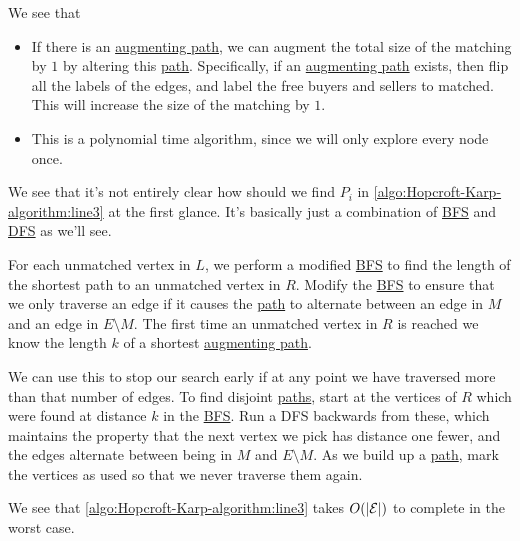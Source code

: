 \begin{intuition}
	We see that
	\begin{itemize}
		\item If there is an \hyperref[def:augmenting-path]{augmenting path}, we can augment the total size of the matching by \(1\) by altering this \hyperref[def:path]{path}. Specifically, if an \hyperref[def:augmenting-path]{augmenting path} exists, then flip all the labels of the edges, and label the free buyers and sellers to matched. This will increase the size of the matching by \(1\).
		\item This is a polynomial time algorithm, since we will only explore every node once.
	\end{itemize}
\end{intuition}

\begin{remark}\label{rmk:lec25-1}
	We see that it's not entirely clear how should we find \(P_i\) in \autoref{algo:Hopcroft-Karp-algorithm:line3} at the first glance. It's basically just a combination of \hyperref[algo:BFS]{BFS} and \hyperref[rmk:DFS]{DFS} as we'll see.
\end{remark}
\begin{explanation}
	For each unmatched vertex in \(L\), we perform a modified \hyperref[algo:BFS]{BFS} to find the length of the shortest path to an unmatched vertex in \(R\). Modify the \hyperref[algo:BFS]{BFS} to ensure that we only traverse an edge if it causes the \hyperref[def:path]{path} to alternate between an edge in \(M\) and an edge in \(E\setminus M\). The first time an unmatched vertex in \(R\) is reached we know the length \(k\) of a shortest \hyperref[def:augmenting-path]{augmenting path}.

	We can use this to stop our search early if at any point we have traversed more than that number of edges. To find disjoint \hyperref[def:path]{paths}, start at the vertices of \(R\) which were found at distance \(k\) in the \hyperref[algo:BFS]{BFS}. Run a DFS backwards from these, which maintains the property that the next vertex we pick has distance one fewer, and the edges alternate between being in \(M\) and \(E\setminus M\). As we build up a \hyperref[def:path]{path}, mark the vertices as used so that we never traverse them again.
\end{explanation}

\begin{remark}
	We see that \autoref{algo:Hopcroft-Karp-algorithm:line3} takes \(O(\left\vert \mathcal{\MakeUppercase{e}} \right\vert )\) to complete in the worst case.
\end{remark}

